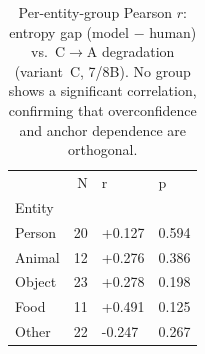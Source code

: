 \begin{table}[t]
\centering
\caption{Per-entity-group Pearson $r$: entropy gap (model $-$ human) vs.\ C$\to$A degradation (variant~C, 7/8B). No group shows a significant correlation, confirming that overconfidence and anchor dependence are orthogonal.}
\label{tab:entropy_gap_entity}
\small
\begin{tabular}{lrll}
\toprule
 & N & r & p \\
Entity &  &  &  \\
\midrule
Person & 20 & +0.127 & 0.594 \\
Animal & 12 & +0.276 & 0.386 \\
Object & 23 & +0.278 & 0.198 \\
Food & 11 & +0.491 & 0.125 \\
Other & 22 & -0.247 & 0.267 \\
\bottomrule
\end{tabular}
\end{table}
